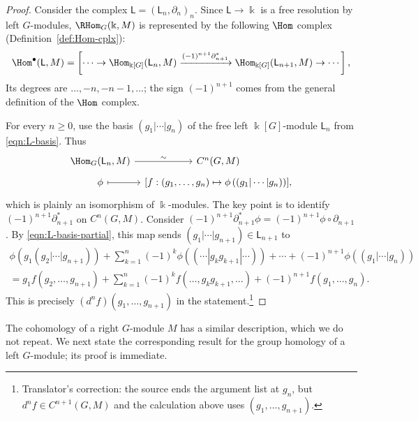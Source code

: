 \begin{proof}
	Consider the complex $\mathsf{L}=(\mathsf{L}_n,\partial_n)_n$. Since
	$\mathsf{L}\to\Bbbk$ is a free resolution by left $G$-modules,
	$\RHom_G(\Bbbk,M)$ is represented by the following $\Hom$ complex
	(Definition~\ref{def:Hom-cplx}):
	\begin{equation*}
		\Hom^\bullet(\mathsf{L}, M) = \left[ \cdots \to \Hom_{\Bbbk[G]}(\mathsf{L}_n, M) \xrightarrow{(-1)^{n+1} \partial_{n+1}^*} \Hom_{\Bbbk[G]}(\mathsf{L}_{n+1}, M) \to \cdots \right] ,
	\end{equation*}
	Its degrees are $\ldots,-n,-n-1,\ldots$; the sign $(-1)^{n+1}$ comes
	from the general definition of the $\Hom$ complex.

	For every $n\geq0$, use the basis $(g_1|\cdots|g_n)$ of the free left
	$\Bbbk[G]$-module $\mathsf{L}_n$ from \eqref{eqn:L-basis}. Thus
	\[\begin{tikzcd}[row sep=tiny, column sep=tiny]
		\Hom_G(\mathsf{L}_n, M) \arrow[r, "\sim"] & C^n(G, M) \\
		\phi \arrow[mapsto, r] & {\left[ f: (g_1, \ldots, g_n) \mapsto \phi\left( (g_1 | \cdots | g_n) \right)\right]} ,
	\end{tikzcd}\]
	which is plainly an isomorphism of $\Bbbk$-modules. The key point is to
	identify $(-1)^{n+1}\partial_{n+1}^*$ on $C^n(G,M)$. Consider
	$(-1)^{n+1}\partial_{n+1}^*\phi=(-1)^{n+1}\phi\circ\partial_{n+1}$.
	By \eqref{eqn:L-basis-partial}, this map sends
	$(g_1|\cdots|g_{n+1})\in\mathsf{L}_{n+1}$ to
	\begin{multline*}
		\phi\left( g_1 (g_2 | \cdots | g_{n+1})\right) + \sum_{k=1}^n (-1)^k \phi\left((\cdots | g_k g_{k+1}| \cdots)\right) + \cdots + (-1)^{n+1} \phi\left((g_1 | \cdots |g_n)\right) \\
		= g_1 f(g_2, \ldots, g_{n+1}) + \sum_{k=1}^n (-1)^k f(\ldots, g_k g_{k+1}, \ldots) + (-1)^{n+1} f(g_1, \ldots, g_n).
	\end{multline*}
	This is precisely $(d^nf)(g_1,\ldots,g_{n+1})$ in the
	statement.\footnote{Translator's correction: the source ends the argument
	list at $g_n$, but $d^nf\in C^{n+1}(G,M)$ and the calculation above uses
	$(g_1,\ldots,g_{n+1})$.}
\end{proof}

The cohomology of a right $G$-module $M$ has a similar description, which we
do not repeat. We next state the corresponding result for the group homology
of a left $G$-module; its proof is immediate.


